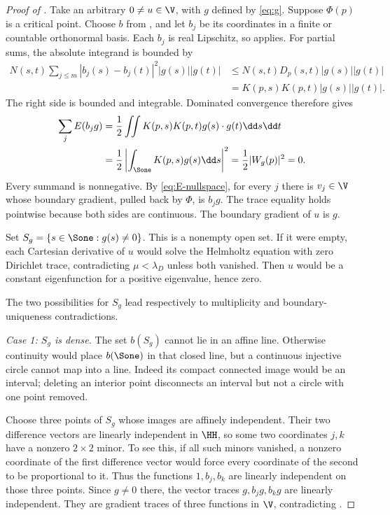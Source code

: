 \begin{proof}[Proof of ]
Take an arbitrary $0\ne u\in\V$, with $g$ defined by \eqref{eq:g}. Suppose $\Phi(p)$ is a critical point. Choose $b$ from , and let $b_j$ be its coordinates in a finite or countable orthonormal basis. Each $b_j$ is real Lipschitz, so  applies. For partial sums, the absolute integrand is bounded by
\begin{align*}
N(s,t)\sum_{j\le m}|b_j(s)-b_j(t)|^2|g(s)||g(t)|
&\le N(s,t)D_p(s,t)|g(s)||g(t)|\\
&=K(p,s)K(p,t)|g(s)||g(t)|.
\end{align*}
The right side is bounded and integrable. Dominated convergence therefore gives
\begin{align}
\sum_j E(b_jg)
&=\frac12\iint K(p,s)K(p,t)g(s)\cdot g(t)\dd s\dd t\notag\\
&=\frac12\left|\int_{\Sone}K(p,s)g(s)\dd s\right|^2
=\frac12|W_g(p)|^2=0.\label{eq:sum-energy}
\end{align}
Every summand is nonnegative. By \eqref{eq:E-nullspace}, for every $j$ there is $v_j\in\V$ whose boundary gradient, pulled back by $\Phi$, is $b_jg$. The trace equality holds pointwise because both sides are continuous. The boundary gradient of $u$ is $g$.

Set $S_g=\{s\in\Sone:g(s)\ne0\}$. This is a nonempty open set. If it were empty, each Cartesian derivative of $u$ would solve the Helmholtz equation with zero Dirichlet trace, contradicting $\mu<\lambda_D$ unless both vanished. Then $u$ would be a constant eigenfunction for a positive eigenvalue, hence zero.

The two possibilities for $S_g$ lead respectively to multiplicity and boundary-uniqueness contradictions.

\smallskip\noindent
\emph{Case 1: $S_g$ is dense.}
The set $b(S_g)$ cannot lie in an affine line. Otherwise continuity would place $b(\Sone)$ in that closed line, but a continuous injective circle cannot map into a line. Indeed its compact connected image would be an interval; deleting an interior point disconnects an interval but not a circle with one point removed.

Choose three points of $S_g$ whose images are affinely independent. Their two difference vectors are linearly independent in $\HH$, so some two coordinates $j,k$ have a nonzero $2\times2$ minor. To see this, if all such minors vanished, a nonzero coordinate of the first difference vector would force every coordinate of the second to be proportional to it. Thus the functions $1,b_j,b_k$ are linearly independent on those three points. Since $g\ne0$ there, the vector traces $g,b_jg,b_kg$ are linearly independent. They are gradient traces of three functions in $\V$, contradicting .


\end{proof}
